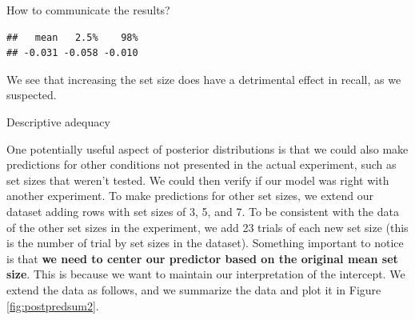 \documentclass[12pt,ignorenonframetext,aspectratio=169]{beamer}
\newenvironment{Shaded}{\begin{snugshade}}{\end{snugshade}}
\newcommand{\ControlFlowTok}[1]{\textcolor[rgb]{0.13,0.29,0.53}{\textbf{#1}}}
\newcommand{\DataTypeTok}[1]{\textcolor[rgb]{0.13,0.29,0.53}{#1}}
\newcommand{\DecValTok}[1]{\textcolor[rgb]{0.00,0.00,0.81}{#1}}
\newcommand{\KeywordTok}[1]{\textcolor[rgb]{0.13,0.29,0.53}{\textbf{#1}}}
\newcommand{\NormalTok}[1]{#1}
\newcommand{\OperatorTok}[1]{\textcolor[rgb]{0.81,0.36,0.00}{\textbf{#1}}}
\newcommand{\StringTok}[1]{\textcolor[rgb]{0.31,0.60,0.02}{#1}}
\begin{document}
\begin{frame}[fragile]{How to communicate the results?}
\begin{verbatim}
##   mean   2.5%    98% 
## -0.031 -0.058 -0.010
\end{verbatim}

\normalsize

We see that increasing the set size does have a detrimental effect in recall, as we suspected.

\end{frame}

\begin{frame}[fragile]{Descriptive adequacy}
\protect\hypertarget{descriptive-adequacy}{}

One potentially useful aspect of posterior distributions is that we could also make predictions for other conditions not presented in the actual experiment, such as set sizes that weren't tested. We could then verify if our model was right with another experiment. To make predictions for other set sizes, we extend our dataset adding rows with set sizes of 3, 5, and 7. To be consistent with the data of the other set sizes in the experiment, we add 23 trials of each new set size (this is the number of trial by set sizes in the dataset). Something important to notice is that \textbf{we need to center our predictor based on the original mean set size}. This is because we want to maintain our interpretation of the intercept. We extend the data as follows, and we summarize the data and plot it in Figure \ref{fig:postpredsum2}.

\small

\begin{Shaded}
\end{Shaded}


\end{frame}
\end{document}

